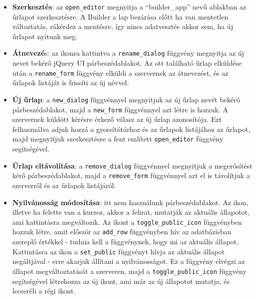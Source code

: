 \documentclass[12pt,a4paper,twoside]{article}
\begin{document}
\begin{itemize}
\item \textbf{Szerkesztés}: az \texttt{open\_editor} megnyitja a ``builder\_app'' nevű ablakban az űrlapot
  szerkesztésre. A Builder a lap bezárása előtt ha van mentetlen változtatás,
  rákérdez a mentésre, így nincs adatvesztés akkor sem, ha új űrlapot nyitunk meg.
\item \textbf{Átnevezé}s: az ikonra kattintva a \texttt{rename\_dialog} függvény megnyitja
  az új nevet bekérő jQuery UI párbeszédablakot. Az ott található űrlap
  elküldése után a \texttt{rename\_form} függvény elküldi a szervernek az
  átnevezést, és az űrlapok listáját is frissíti az új névvel.
\item \textbf{Új űrlap}: a \texttt{new\_dialog} függvénnyel megnyitjuk az új űrlap nevét
  bekérő párbeszédablakot, majd a \texttt{new\_form} függvénnyel azt létre is
  hozzuk. A szervernek küldött kérésre érkező válasz az új űrlap
  azonosítója. Ezt felhasználva adjuk hozzá a gyorsítótárhoz és az űrlapok
  listájához az űrlapot, majd megnyitjuk szerkesztésre a fent említett
  \texttt{open\_editor} függvény segítségével.
\item \textbf{Űrlap eltávolítása}: a \texttt{remove\_dialog} függvénnyel megnyitjuk a
  megerősítést kérő párbeszédablakot, majd a \texttt{remove\_form} függvénnyel
  azt el is távolítjuk a szerverről és az űrlapok listájáról.
\item \textbf{Nyilvánosság módosítása}: itt nem használunk párbeszédablakot. Az ikon,
  illetve ha felette van a kurzor, akkor a felirat, mutatják az aktuális
  állapotot, ami kattintásra megváltozik. Az ikont a
  \texttt{toggle\_public\_icon} függvényben hozzuk létre, amit először az \texttt{add\_row}
  függvényben hív az adatbázisban szereplő értékkel - tudnia kell a függvénynek,
  hogy mi az aktuális állapot. Kattintásra az ikon a \texttt{set\_public}
  függvényt hívja az aktuális állapot negáltjával - erre akarjuk állítani a
  nyilvánosságot. Ez a függvény elvégzi az állapot megváltoztatását a szerveren,
  majd a \texttt{toggle\_public\_icon} függvény segítségével létrehozza az új
  ikont, ami már az új állapotot mutatja, és lecseréli a régi ikont.
\end{itemize}
\end{document}
